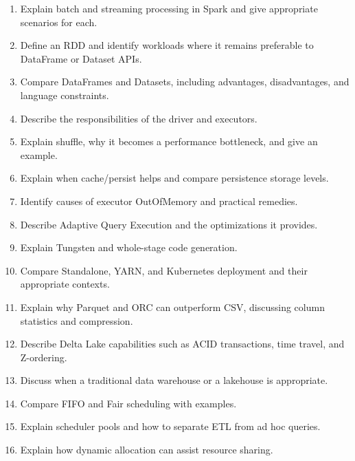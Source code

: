 \documentclass[11pt,a4paper]{article}
\begin{document}
\begin{enumerate}

\item Explain batch and streaming processing in Spark and give appropriate scenarios for each.

\item Define an RDD and identify workloads where it remains preferable to DataFrame or Dataset APIs.

\item Compare DataFrames and Datasets, including advantages, disadvantages, and language constraints.

\item Describe the responsibilities of the driver and executors.

\item Explain shuffle, why it becomes a performance bottleneck, and give an example.

\item Explain when cache/\allowbreak{}persist helps and compare persistence storage levels.

\item Identify causes of executor OutOfMemory and practical remedies.

\item Describe Adaptive Query Execution and the optimizations it provides.

\item Explain Tungsten and whole-stage code generation.

\item Compare Standalone, YARN, and Kubernetes deployment and their appropriate contexts.

\item Explain why Parquet and ORC can outperform CSV, discussing column statistics and compression.

\item Describe Delta Lake capabilities such as ACID transactions, time travel, and Z-ordering.

\item Discuss when a traditional data warehouse or a lakehouse is appropriate.

\item Compare FIFO and Fair scheduling with examples.

\item Explain scheduler pools and how to separate ETL from ad hoc queries.

\item Explain how dynamic allocation can assist resource sharing.

\end{enumerate}
\end{document}
